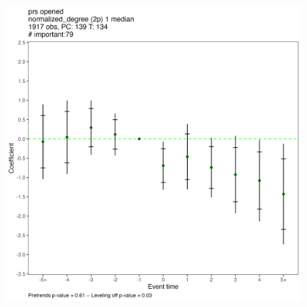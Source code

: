 \begin{figure}[htbp]
\begin{minipage}[b]{0.32\textwidth}
    \end{minipage}
    \hfill
    \begin{minipage}[b]{0.32\textwidth}
        \centering
        \includegraphics[width=\textwidth]{temp/normalized_degree/all_normalized_degree_2p_1_median.png}
    \end{minipage}
    
    \vspace{0.5cm} %
    

\end{figure}
